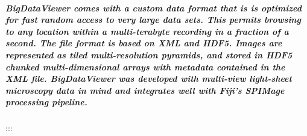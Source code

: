\documentclass[
  letterpaper,
  DIV=11,
  numbers=noendperiod]{scrartcl}
\let\oldsubparagraph\subparagraph
\renewcommand{\subparagraph}[1]{\oldsubparagraph{#1}\mbox{}}
\begin{document}
\hypertarget{bigdataviewer-comes-with-a-custom-data-format-that-is-is-optimized-for-fast-random-access-to-very-large-data-sets.-this-permits-browsing-to-any-location-within-a-multi-terabyte-recording-in-a-fraction-of-a-second.-the-file-format-is-based-on-xml-and-hdf5.-images-are-represented-as-tiled-multi-resolution-pyramids-and-stored-in-hdf5-chunked-multi-dimensional-arrays-with-metadata-contained-in-the-xml-file.-bigdataviewer-was-developed-with-multi-view-light-sheet-microscopy-data-in-mind-and-integrates-well-with-fijis-spimage-processing-pipeline.}{%
\subparagraph{BigDataViewer comes with a custom data format that is is
optimized for fast random access to very large data sets. This permits
browsing to any location within a multi-terabyte recording in a fraction
of a second. The file format is based on XML and HDF5. Images are
represented as tiled multi-resolution pyramids, and stored in HDF5
chunked multi-dimensional arrays with metadata contained in the XML
file. BigDataViewer was developed with multi-view light-sheet microscopy
data in mind and integrates well with Fiji's SPIMage processing
pipeline.}\label{bigdataviewer-comes-with-a-custom-data-format-that-is-is-optimized-for-fast-random-access-to-very-large-data-sets.-this-permits-browsing-to-any-location-within-a-multi-terabyte-recording-in-a-fraction-of-a-second.-the-file-format-is-based-on-xml-and-hdf5.-images-are-represented-as-tiled-multi-resolution-pyramids-and-stored-in-hdf5-chunked-multi-dimensional-arrays-with-metadata-contained-in-the-xml-file.-bigdataviewer-was-developed-with-multi-view-light-sheet-microscopy-data-in-mind-and-integrates-well-with-fijis-spimage-processing-pipeline.}}

:::
\end{document}
